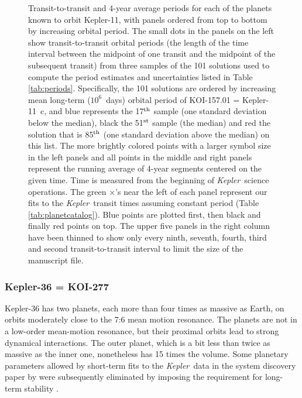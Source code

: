 \documentclass{aastex62}
\newcommand{\ik}{{\it Kepler~}}
\begin{document}
\begin{figure}[!hbt]
 \caption{Transit-to-transit and 4-year average periods for each of the planets known to orbit Kepler-11, with panels ordered from top to bottom by increasing orbital period. The small dots in the panels on the left show transit-to-transit orbital periods (the length of the time interval between the midpoint of one transit and the midpoint of the subsequent transit) from three samples of the 101 solutions used to compute the period estimates and uncertainties listed in Table \ref{tab:periods}. Specifically, the 101 solutions are ordered by increasing mean long-term ($10^6$~days) orbital period of KOI-157.01 = Kepler-11~c, and blue represents the 17$^{\rm th}$ sample (one standard deviation below the median), black the 51$^{\rm st}$ sample (the median) and red the solution that is 85$^{\rm th}$ (one standard deviation above the median) on this list. The more brightly colored points with a larger symbol size in the left panels and all points in the middle and right panels represent the running average of 4-year segments centered on the given time.  Time is measured from the beginning of \ik science operations. The green $\times$'s near the left of each panel represent our fits to the \ik transit times assuming constant period (Table \ref{tab:planetcatalog}). Blue points are plotted first, then black and finally red points on top. {The upper five panels in the right column have been thinned to show only every ninth, seventh, fourth, third and second transit-to-transit interval to limit the size of the manuscript file. }\label{fig:Kep11}  } 
\end{figure}


\subsubsection{Kepler-36 = KOI-277}

Kepler-36 has two planets, each more than four times as massive as Earth, on %
orbits moderately close to the 7:6 mean motion resonance.  The planets are not in a low-order mean-motion resonance, but their proximal orbits lead to strong dynamical interactions.  The outer planet, which is a bit less than twice as massive as the inner one, nonetheless has 15 times the volume.  
Some planetary parameters allowed by short-term fits to the \ik data in the system discovery paper by  \cite{Carter:2012} were subsequently eliminated by imposing the requirement for long-term stability  \citep{Deck:2012}. 
\end{document}
